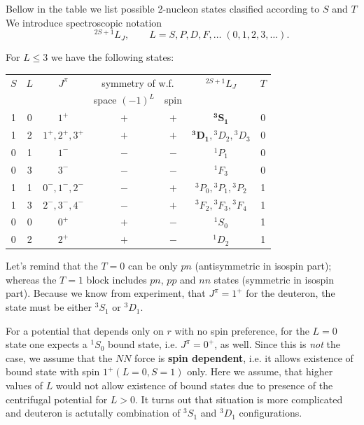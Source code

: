 \documentclass[11pt,a4paper]{article}
\begin{document}
Bellow in the table we list possible 2-nucleon states clasified according to $S$ and $T$
We introduce spectroscopic notation 
\[
\qquad {}^{2S+1}L_J, \qquad L=S,P,D,F,\dots \;(0,1,2,3,\dots).
\]

For $L\le 3$ we have the following states:

\begin{center}
\renewcommand{\arraystretch}{1.3}
\begin{tabular}{c c c c c c c}
\hline
$S$ & $L$ & $J^\pi$ & \multicolumn{2}{c}{symmetry of w.f.} & ${}^{2S+1}L_J$ & $T$ \\
 & & & space $(-1)^L$ & spin & & \\
\hline
1 & 0 & $1^+$ & $+$ & $+$ & $\mathbf{{}^3S_1}$ & 0 \\
1 & 2 & $1^+,2^+,3^+$ & $+$ & $+$ & $\mathbf{{}^3D_1},{}^3D_2,{}^3D_3$ & 0 \\
0 & 1 & $1^-$ & $-$ & $-$ & ${}^1P_1$ & 0 \\
0 & 3 & $3^-$ & $-$ & $-$ & ${}^1F_3$ & 0 \\
\hline
1 & 1 & $0^-,1^-,2^-$ & $-$ & $+$ & ${}^3P_0,{}^3P_1,{}^3P_2$ & 1 \\
1 & 3 & $2^-,3^-,4^-$ & $-$ & $+$ & ${}^3F_2,{}^3F_3,{}^3F_4$ & 1 \\
0 & 0 & $0^+$ & $+$ & $-$ & ${}^1S_0$ & 1 \\
0 & 2 & $2^+$ & $+$ & $-$ & ${}^1D_2$ & 1 \\
\hline
\end{tabular}
\end{center}
Let's remind that the $T=0$ can be only $pn$ (antisymmetric in isospin part); whereas the $T=1$ block includes $pn$, $pp$ and $nn$ states (symmetric in isospin part).
Because we know from experiment, that $J^\pi=1^+$ for the deuteron, the state must be either ${}^3S_1$ or ${}^3D_1$.

For a potential that depends only on $r$ with no spin preference, for the $L=0$ state one expects a ${}^1S_0$ bound state, i.e. $J^\pi=0^+$, as well. Since this is \emph{not} the case, we assume that the $NN$
force is \textbf{spin dependent}, i.e. it allows existence of bound state with spin $1^+ (L=0, S=1)$ only. Here we assume, that higher values of $L$ would not allow existence of bound states due to presence of the centrifugal potential for $L>0$. It turns out that situation is more complicated and deuteron is actutally combination of ${}^3S_1$ and ${}^3D_1$ configurations. 
\end{document}
